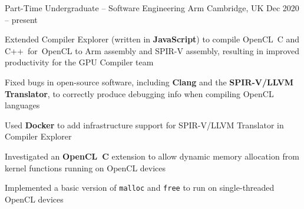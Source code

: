 

\begin{cventries}



\cventry
{Part-Time Undergraduate -- Software Engineering} %
{Arm} %
{Cambridge, UK} %
{Dec 2020 -- present} %
{
  \begin{cvitems} %
    \item Extended Compiler Explorer (written in \textbf{JavaScript}) to compile OpenCL~C and C++~for~OpenCL to Arm assembly and SPIR-V assembly, resulting in improved productivity for the GPU Compiler team
    \item Fixed bugs in open-source software, including \textbf{Clang} and the \textbf{SPIR-V/LLVM Translator}, to correctly produce debugging info when compiling OpenCL languages
    \item Used \textbf{Docker} to add infrastructure support for SPIR-V/LLVM Translator in Compiler Explorer
    \item Investigated an \textbf{OpenCL~C} extension to allow dynamic memory allocation from kernel functions running on OpenCL devices
    \item Implemented a basic version of \lstinline$malloc$ and \lstinline$free$ to run on single-threaded OpenCL devices
  \end{cvitems}
}


\end{cventries}
